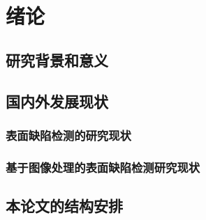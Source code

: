 \chapter{绪论}
\section{研究背景和意义}
\section{国内外发展现状}
\subsection{表面缺陷检测的研究现状}
\subsection{基于图像处理的表面缺陷检测研究现状}
\section{本论文的结构安排}

